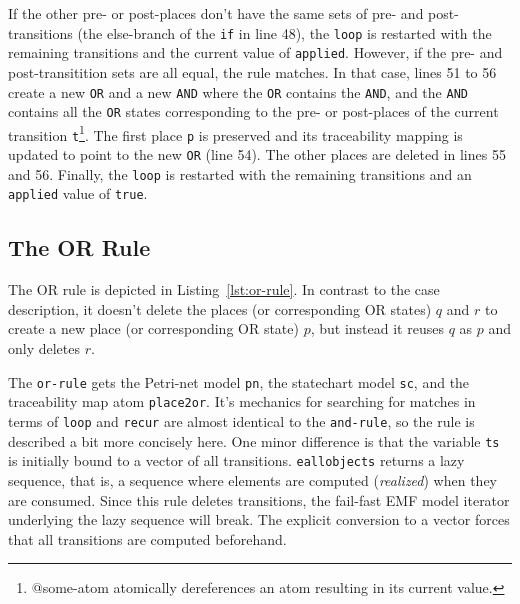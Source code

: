 \documentclass[11pt]{article}
\begin{document}
If the other pre- or post-places don't have the same sets of pre- and
post-transitions (the else-branch of the \verb|if| in line 48), the \verb|loop|
is restarted with the remaining transitions and the current value of
\verb|applied|.  However, if the pre- and post-transitition sets are all equal,
the rule matches.  In that case, lines 51 to 56 create a new \verb|OR| and a
new \verb|AND| where the \verb|OR| contains the \verb|AND|, and the \verb|AND|
contains all the \verb|OR| states corresponding to the pre- or post-places of
the current transition \verb|t|\footnote{\textsf{@some-atom atomically
    dereferences an atom resulting in its current value.}}.  The first place
\verb|p| is preserved and its traceability mapping is updated to point to the
new \verb|OR| (line 54).  The other places are deleted in lines 55 and 56.
Finally, the \verb|loop| is restarted with the remaining transitions and an
\verb|applied| value of \verb|true|.

\subsection{The OR Rule}
\label{sec:or-rule}

The OR rule is depicted in Listing~\ref{lst:or-rule}.  In contrast to the case
description, it doesn't delete the places (or corresponding OR states) $q$ and
$r$ to create a new place (or corresponding OR state) $p$, but instead it
reuses $q$ as $p$ and only deletes $r$.

The \verb|or-rule| gets the Petri-net model \verb|pn|, the statechart model
\verb|sc|, and the traceability map atom \verb|place2or|.  It's mechanics for
searching for matches in terms of \verb|loop| and \verb|recur| are almost
identical to the \verb|and-rule|, so the rule is described a bit more concisely
here.  One minor difference is that the variable \verb|ts| is initially bound
to a vector of all transitions.  \verb|eallobjects| returns a lazy sequence,
that is, a sequence where elements are computed (\emph{realized}) when they are
consumed.  Since this rule deletes transitions, the fail-fast EMF model
iterator underlying the lazy sequence will break.  The explicit conversion to a
vector forces that all transitions are computed beforehand.
\end{document}
